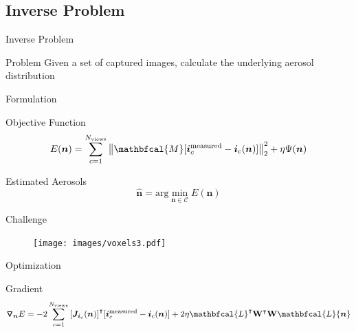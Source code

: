 \documentclass[compress,red,12pt]{beamer}
\newcommand{\Grad}[1]{\bm{\triangledown_{#1}}}
\newcommand{\argmin}{\mathrm{arg}\min}
\newcommand{\vect}[1]{\bm{#1}}
\newcommand{\transpose}[1]{{#1}^\intercal}
\newcommand{\MaskSun}{\mathbfcal{M}}
\newcommand{\Laplacian}{\mathbfcal{L}}
\newcommand{\DistSet}{\mathcal{C}}
\newcommand{\DistUnknown}{\vect{n}}
\newcommand{\DistEstimated}{\hat{\vect{n}}}
\newcommand{\CostFunc}[1]{E(#1)}
\begin{document}

\subsection{Inverse Problem}

\begin{frame}{Inverse Problem}
  \begin{block}{Problem}
    Given a set of captured images, calculate the underlying aerosol
    distribution
  \end{block}
\end{frame}

\begin{frame}{Formulation}
  \begin{block}{Objective Function}
    \begin{equation*}
      \CostFunc{\DistUnknown}
      = \sum_{c=1}^{N_{\rm views}}
      \left\|
        \MaskSun[{\bm i}^{\rm measured}_c - {\bm i}_c({\bm n})]
      \right\|^2_2  + \eta \Psi({\bm n})
    \end{equation*}
  \end{block}
  \begin{block}{Estimated Aerosols}
    \begin{equation*}
      \DistEstimated =
      \argmin_{\DistUnknown \in \DistSet} \CostFunc{\DistUnknown}
    \end{equation*}
  \end{block}
\end{frame}

\begin{frame}{Challenge}
  \begin{figure}
    \centering
    \centerline{\texttt{[image: images/voxels3.pdf]}}
  \end{figure}
\end{frame}

\begin{frame}[label=gradient]{Optimization}
  \begin{block}{Gradient}
    \begin{equation*}
      \Grad{{\bm n}} E = -2\sum_{c=1}^{N_{\rm views}}
      \transpose{\left[{\bm J}_{{\bm i}_c}({\bm n})\right]} [{\bm i}^{\rm
        measured}_c - {\bm i}_c({\bm n})] + 2 \eta
      \transpose{\Laplacian}\transpose{{\bf W}}{\bf W}\Laplacian{\bm n}
    \end{equation*}
  \end{block}
  \hfill\hyperlink{jacobian}{}
\end{frame}
\end{document}
